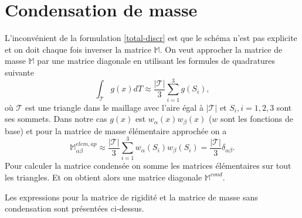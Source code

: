 \documentclass[12pt]{article}
\begin{document}
	\section{Condensation de masse}
	L'inconvénient de la formulation \eqref{total-discr} est que le schéma n'est pas explicite et on doit chaque fois inverser la matrice $\mathbb{M}$. On veut approcher la matrice de masse $\mathbb{M}$ par une matrice diagonale en utilisant les formules de quadratures suivante
	\begin{equation*}
	\int_{\mathcal{T}}{g(x) dT} \approx \frac{|\mathcal{T}|}{3}\sum_{i = 1}^3{g(S_i)},
	\end{equation*}
	où $\mathcal{T}$ est une triangle dans le maillage avec l'aire égal à $|\mathcal{T}|$ et $S_i, i = 1,2,3$ sont ses sommets.
	Dans notre cas $g(x)$ est $w_\alpha(x)w_\beta(x)$ ($w$ sont les fonctions de base) et pour la matrice de masse élémentaire approchée on a 
	\begin{equation*}
	\mathbb{M}^{elem, ap}_{\alpha \beta} \approx \frac{|\mathcal{T}|}{3}\sum_{i=1}^{3} {w_\alpha(S_i) w_\beta(S_i)} = \frac{|\mathcal{T}|}{3} \delta_{\alpha \beta}.
	\end{equation*}
	Pour calculer la matrice condensée on somme les matrices élémentaires sur tout les triangles. Et on obtient alors une matrice diagonale $\mathbb{M}^{cond}$.
	
	Les expressions pour la matrice de rigidité et la matrice de masse sans condensation sont présentées ci-dessus.
\end{document}
